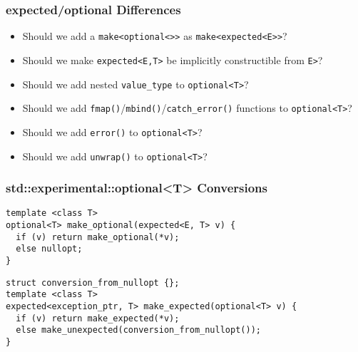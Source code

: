 \documentclass[xcolor=dvipsnames]{beamer}
\newcommand{\cpp}[1]{\lstinline{#1}}
\begin{document}
\begin{frame}[fragile]
\frametitle{expected/optional Differences }

\begin{itemize}
\item Should we add a \cpp{make<optional<>>} as \cpp{make<expected<E>>}?
\item Should we make \cpp{expected<E,T>} be implicitly constructible from \cpp{E>}?
\item Should we add nested \cpp{value_type} to \cpp{optional<T>}?
\item Should we add  \cpp{fmap()}/\cpp{mbind()}/\cpp{catch_error()}  functions to \cpp{optional<T>}?
\item Should we add  \cpp{error()} to \cpp{optional<T>}?
\item Should we add  \cpp{unwrap()} to \cpp{optional<T>}?
\end{itemize}

\end{frame}

\begin{frame}[fragile]
\frametitle{std::experimental::optional<T> Conversions}

\begin{lstlisting}
template <class T>
optional<T> make_optional(expected<E, T> v) {
  if (v) return make_optional(*v);
  else nullopt;
}
\end{lstlisting}

\begin{lstlisting}
struct conversion_from_nullopt {};
template <class T>
expected<exception_ptr, T> make_expected(optional<T> v) {
  if (v) return make_expected(*v);
  else make_unexpected(conversion_from_nullopt());
}
\end{lstlisting}
\end{frame}
\end{document}
